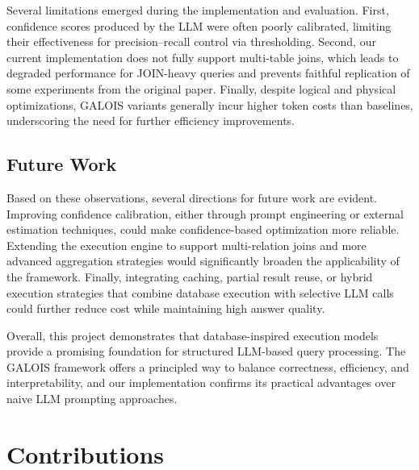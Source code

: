 \documentclass[11pt]{article}
\begin{document}
Several limitations emerged during the implementation and evaluation. First, confidence scores produced by the LLM were often poorly calibrated, limiting their effectiveness for precision–recall control via thresholding. Second, our current implementation does not fully support multi-table joins, which leads to degraded performance for JOIN-heavy queries and prevents faithful replication of some experiments from the original paper. Finally, despite logical and physical optimizations, GALOIS variants generally incur higher token costs than baselines, underscoring the need for further efficiency improvements.

\subsection{Future Work}
Based on these observations, several directions for future work are evident. Improving confidence calibration, either through prompt engineering or external estimation techniques, could make confidence-based optimization more reliable. Extending the execution engine to support multi-relation joins and more advanced aggregation strategies would significantly broaden the applicability of the framework. Finally, integrating caching, partial result reuse, or hybrid execution strategies that combine database execution with selective LLM calls could further reduce cost while maintaining high answer quality.

Overall, this project demonstrates that database-inspired execution models provide a promising foundation for structured LLM-based query processing. The GALOIS framework offers a principled way to balance correctness, efficiency, and interpretability, and our implementation confirms its practical advantages over naive LLM prompting approaches.

\clearpage
\section{Contributions}
\end{document}
